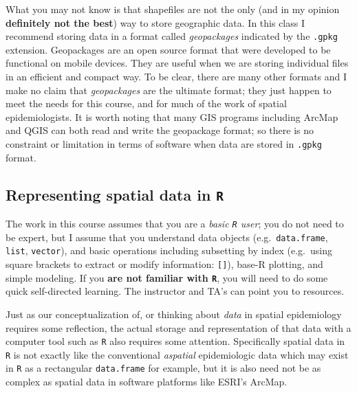 \documentclass[
]{book}
\newcommand{\passthrough}[1]{#1}
\begin{document}
What you may not know is that shapefiles are not the only (and in my opinion \textbf{definitely not the best}) way to store geographic data. In this class I recommend storing data in a format called \emph{geopackages} indicated by the \passthrough{\lstinline!.gpkg!} extension. Geopackages are an open source format that were developed to be functional on mobile devices. They are useful when we are storing individual files in an efficient and compact way. To be clear, there are many other formats and I make no claim that \emph{geopackages} are the ultimate format; they just happen to meet the needs for this course, and for much of the work of spatial epidemiologists. It is worth noting that many GIS programs including ArcMap and QGIS can both read and write the geopackage format; so there is no constraint or limitation in terms of software when data are stored in \passthrough{\lstinline!.gpkg!} format.

\hypertarget{representing-spatial-data-in-r}{%
\subsection{\texorpdfstring{Representing spatial data in \texttt{R}}{Representing spatial data in R}}\label{representing-spatial-data-in-r}}

The work in this course assumes that you are a \emph{basic \passthrough{\lstinline!R!} user}; you do not need to be expert, but I assume that you understand data objects (e.g.~\passthrough{\lstinline!data.frame!}, \passthrough{\lstinline!list!}, \passthrough{\lstinline!vector!}), and basic operations including subsetting by index (e.g.~using square brackets to extract or modify information: \passthrough{\lstinline![]!}), base-R plotting, and simple modeling. If you \textbf{are not familiar with \passthrough{\lstinline!R!}}, you will need to do some quick self-directed learning. The instructor and TA's can point you to resources.

Just as our conceptualization of, or thinking about \emph{data} in spatial epidemiology requires some reflection, the actual storage and representation of that data with a computer tool such as \passthrough{\lstinline!R!} also requires some attention. Specifically spatial data in \passthrough{\lstinline!R!} is not exactly like the conventional \emph{aspatial} epidemiologic data which may exist in \passthrough{\lstinline!R!} as a rectangular \passthrough{\lstinline!data.frame!} for example, but it is also need not be as complex as spatial data in software platforms like ESRI's ArcMap.
\end{document}
